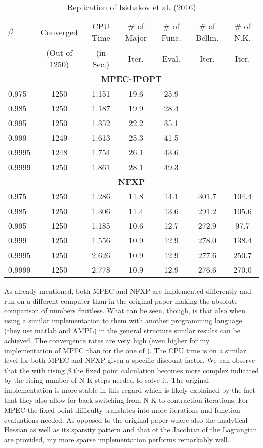 \begin{table}[H]
	\centering
	\caption{Replication of Iskhakov et al. (2016)}
	\label{table1}
	\begin{tabular}{l c c c c c c}
		\toprule\midrule
		$\beta$ & Converged  & CPU Time & \# of Major & \# of Func. & \# of Bellm. & \# of N.K.   \\
		& (Out of 1250) & (in Sec.) & Iter. & Eval. & Iter. & Iter. \\
		\midrule
		\multicolumn{7}{c}{\textbf{MPEC-IPOPT}} \\
		0.975 & 1250 & 1.151 & 19.6 & 25.9 \\
		0.985 & 1250 & 1.187 & 19.9 & 28.4 \\
		0.995 & 1250 & 1.352 & 22.2 & 35.1 \\
		0.999 & 1249 & 1.613 & 25.3 & 41.5 \\
		0.9995 & 1248 & 1.754 & 26.1 & 43.6 \\
		0.9999 & 1250 & 1.861 & 28.1 & 49.3 \\
		\multicolumn{7}{c}{\textbf{NFXP}} \\
		0.975 & 1250 & 1.286 & 11.8 & 14.1 & 301.7 & 104.4 \\
		0.985 & 1250 & 1.306 & 11.4 & 13.6 & 291.2 & 105.6 \\
		0.995 & 1250 & 1.185 & 10.6 & 12.7 & 272.9 & 97.7 \\
		0.999 & 1250  & 1.556 & 10.9 & 12.9 & 278.0 & 138.4 \\
		0.9995 & 1250 & 2.626 & 10.9 & 12.9 & 277.6 & 250.7 \\
		0.9999 & 1250 & 2.778 & 10.9 & 12.9 & 276.6 & 270.0 \\
		\bottomrule
	\end{tabular}
\end{table}

As already mentioned, both MPEC and NFXP are implemented differently and run on a different computer than in the original paper making the absolute comparison of numbers fruitless. What can be seen, though, is that also when using a similar implementation to them with another programming language (they use matlab and AMPL) in the general structure similar results can be achieved. The convergence rates are very high (even higher for my implementation of MPEC than for the one of \citeauthor{Iskhakov.2016}). The CPU time is on a similar level for both MPEC and NFXP given a specific discount factor. We can observe that the with rising $\beta$ the fixed point calculation becomes more complex indicated by the rising number of N-K steps needed to solve it. The original implementation is more stable in this regard which is likely explained by the fact that they also allow for back switching from N-K to contraction iterations. For MPEC the fixed point difficulty translates into more iterations and function evaluations needed. As opposed to the original paper where also the analytical Hessian as well as its sparsity pattern and that of the Jacobian of the Lagrangian are provided, my more sparse implementation performs remarkably well.

